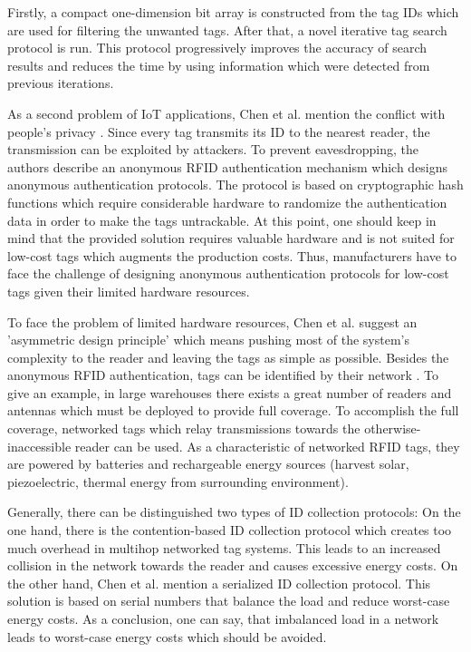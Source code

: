 Firstly, a compact one-dimension bit array is constructed from the tag IDs which are used for filtering the unwanted tags. After that, a novel iterative tag search protocol is run. This protocol progressively improves the accuracy of search results and reduces the time by using information which were detected from previous iterations.

As a second problem of IoT applications, Chen et al. mention the conflict with people's privacy \cite[p.3 f.]{chen}. Since every tag transmits its ID to the nearest reader, the transmission can be exploited by attackers. To prevent eavesdropping, the authors describe an anonymous RFID authentication mechanism which designs anonymous authentication protocols. The protocol is based on cryptographic hash functions which require considerable hardware to randomize the authentication data in order to make the tags untrackable. At this point, one should keep in mind that the provided solution requires valuable hardware and is not suited for low-cost tags which augments the production costs. Thus, manufacturers have to face the challenge of designing anonymous authentication protocols for low-cost tags given their limited hardware resources. 

To face the problem of limited hardware resources, Chen et al. suggest an 'asymmetric design principle' \cite[p.4]{chen} which means pushing most of the system's complexity to the reader and leaving the tags as simple as possible. 
Besides the anonymous RFID authentication, tags can be identified by their network \cite[p.4 f.]{chen}. To give an example, in large warehouses there exists a great number of readers and antennas which must be deployed to provide full coverage. To accomplish the full coverage, networked  tags which relay transmissions towards the otherwise-inaccessible reader can be used. As a characteristic of networked RFID tags, they are powered by batteries and rechargeable energy sources (harvest solar, piezoelectric, thermal energy from surrounding environment).

Generally, there can be distinguished two types of ID collection protocols: On the one hand, there is the contention-based ID collection protocol which creates too much overhead in multihop networked tag systems. This leads to an increased collision in the network towards the reader and causes excessive energy costs. On the other hand, Chen et al. mention a serialized ID collection protocol. This solution is based on serial numbers that balance the load and reduce worst-case energy costs. 
As a conclusion, one can say, that imbalanced load in a network leads to worst-case energy costs which should be avoided.

